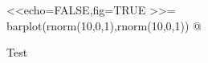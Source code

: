 \documentclass{report}
\begin{document}

\begin{landscape}
\begin{figure}[ht]
\caption{Test}
\centering
<<echo=FALSE,fig=TRUE >>=
barplot(rnorm(10,0,1),rnorm(10,0,1))
@
\end{figure}
\end{landscape}
\end{document}
